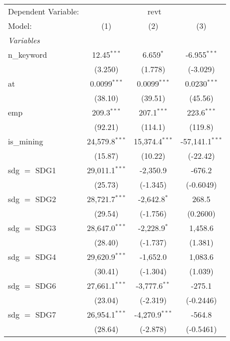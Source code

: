 
\begingroup
\centering
\begin{tabular}{lccc}
   \tabularnewline \midrule \midrule
   Dependent Variable: & \multicolumn{3}{c}{revt}\\
   Model:        & (1)              & (2)              & (3)\\  
   \midrule
   \emph{Variables}\\
   n\_keyword    & 12.45$^{***}$    & 6.659$^{*}$      & -6.955$^{***}$\\   
                 & (3.250)          & (1.778)          & (-3.029)\\   
   at            & 0.0099$^{***}$   & 0.0099$^{***}$   & 0.0230$^{***}$\\   
                 & (38.10)          & (39.51)          & (45.56)\\   
   emp           & 209.3$^{***}$    & 207.1$^{***}$    & 223.6$^{***}$\\   
                 & (92.21)          & (114.1)          & (119.8)\\   
   is\_mining    & 24,579.8$^{***}$ & 15,374.4$^{***}$ & -57,141.1$^{***}$\\   
                 & (15.87)          & (10.22)          & (-22.42)\\   
   sdg $=$ SDG1  & 29,011.1$^{***}$ & -2,350.9         & -676.2\\   
                 & (25.73)          & (-1.345)         & (-0.6049)\\   
   sdg $=$ SDG2  & 28,721.7$^{***}$ & -2,642.8$^{*}$   & 268.5\\   
                 & (29.54)          & (-1.756)         & (0.2600)\\   
   sdg $=$ SDG3  & 28,647.0$^{***}$ & -2,228.9$^{*}$   & 1,458.6\\   
                 & (28.40)          & (-1.737)         & (1.381)\\   
   sdg $=$ SDG4  & 29,620.9$^{***}$ & -1,652.0         & 1,083.6\\   
                 & (30.41)          & (-1.304)         & (1.039)\\   
   sdg $=$ SDG6  & 27,661.1$^{***}$ & -3,777.6$^{**}$  & -275.1\\   
                 & (23.04)          & (-2.319)         & (-0.2446)\\   
   sdg $=$ SDG7  & 26,954.1$^{***}$ & -4,270.9$^{***}$ & -564.8\\   
                 & (28.64)          & (-2.878)         & (-0.5461)\\   

\end{tabular}
